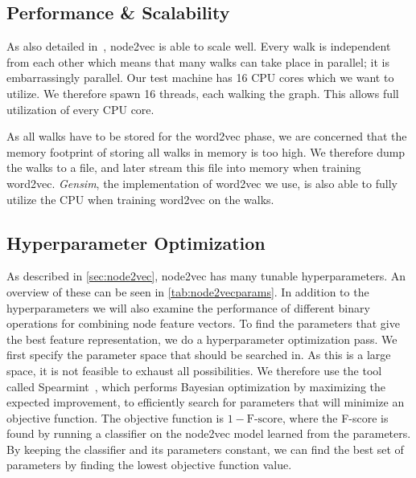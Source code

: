 
\subsection{Performance \& Scalability}
As also detailed in~\cite{node2vec}, node2vec is able to scale well. Every walk is independent from each other which means that many walks can take place in parallel; it is embarrassingly parallel. Our test machine has 16 CPU cores which we want to utilize. We therefore spawn 16 threads, each walking the graph. This allows full utilization of every CPU core.

As all walks have to be stored for the word2vec phase, we are concerned that the memory footprint of storing all walks in memory is too high. We therefore dump the walks to a file, and later stream this file into memory when training word2vec. \emph{Gensim}, the implementation of word2vec we use, is also able to fully utilize the CPU when training word2vec on the walks.

\subsection{Hyperparameter Optimization}\label{sec:hyperopt}
As described in \cref{sec:node2vec}, node2vec has many tunable hyperparameters. An overview of these can be seen in \cref{tab:node2vecparams}. In addition to the hyperparameters we will also examine the performance of different binary operations for combining node feature vectors. To find the parameters that give the best feature representation, we do a hyperparameter optimization pass. We first specify the parameter space that should be searched in. As this is a large space, it is not feasible to exhaust all possibilities. We therefore use the tool called Spearmint~\cite{snoek2012practical}, which performs Bayesian optimization by maximizing the expected improvement, to efficiently search for parameters that will minimize an objective function. The objective function is $1 - \text{F-score}$, where the F-score is found by running a classifier on the node2vec model learned from the parameters. By keeping the classifier and its parameters constant, we can find the best set of parameters by finding the lowest objective function value.

